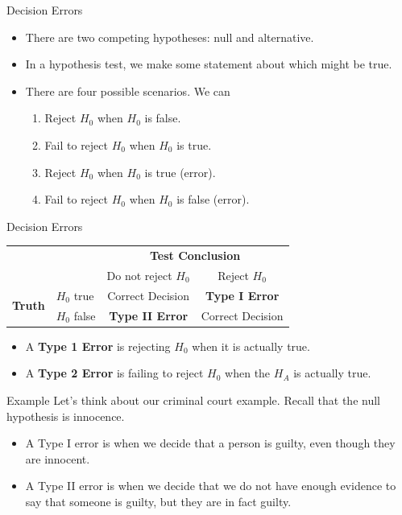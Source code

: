 \begin{frame}{Decision Errors}
    \begin{itemize}
        \item There are two competing hypotheses: null and alternative.
        \item In a hypothesis test, we make some statement about which might be true.
        \item There are four possible scenarios. We can
        \begin{enumerate}
            \item Reject $H_0$ when $H_0$ is false.
            \item Fail to reject $H_0$ when $H_0$ is true.
            \item Reject $H_0$ when $H_0$ is true (error).
            \item Fail to reject $H_0$ when $H_0$ is false (error).
        \end{enumerate}
    \end{itemize}
    
\end{frame}

\begin{frame}{Decision Errors}
    \begin{center}
        \begin{tabular}{llcc}
             & & \multicolumn{2}{c}{\textbf{Test Conclusion}} \\ \cline{3-4} 
             & & Do not reject $H_0$ & Reject $H_0$ \\ \cline{2-4} 
            \multirow{2}{*}{\textbf{Truth}} 
                & $H_0$ true  & Correct Decision & \textbf{Type I Error} \\     & $H_0$ false & \textbf{Type II Error} & Correct Decision \\ \cline{2-4}
        \end{tabular}
    \end{center}
    \begin{itemize}
        \item A \textbf{Type 1 Error} is rejecting $H_0$ when it is actually true.
        \item A \textbf{Type 2 Error} is failing to reject $H_0$ when the $H_A$ is actually true.
    \end{itemize}
\end{frame}

\begin{frame}{Example}
    Let's think about our criminal court example. Recall that the null hypothesis is innocence.
    
    \begin{itemize}
        \item A Type I error is when we decide that a person is guilty, even though they are innocent.
        \item A Type II error is when we decide that we do not have enough evidence to say that someone is guilty, but they are in fact guilty.
    \end{itemize}
\end{frame}

